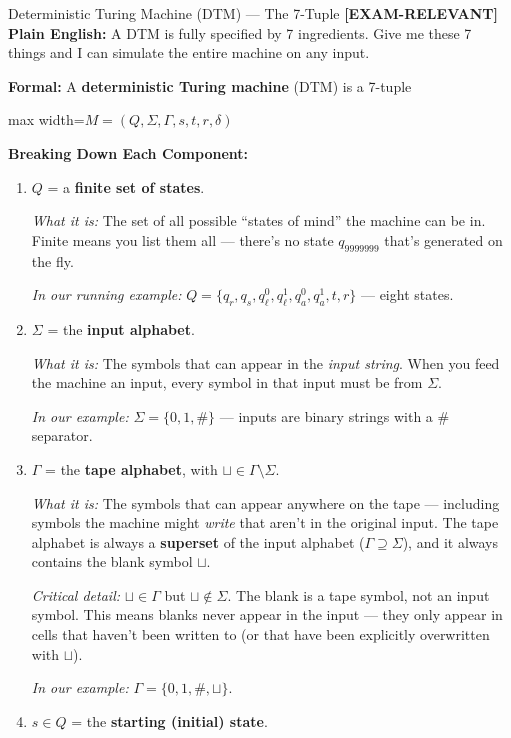 \documentclass[11pt,a4paper]{article}
\newcommand{\fitmath}[1]{\begin{adjustbox}{max width=\linewidth}$\displaystyle #1$\end{adjustbox}}
\newcommand{\kemark}{\textcolor{red!70!black}{\textbf{[EXAM-RELEVANT]}}}
\begin{document}
\begin{definitionbox}{Deterministic Turing Machine (DTM) --- The 7-Tuple \kemark}
\textbf{Plain English:} A DTM is fully specified by 7 ingredients. Give me these 7 things and I can simulate the entire machine on any input.

\textbf{Formal:} A \textbf{deterministic Turing machine} (DTM) is a 7-tuple
\fitmath{M = (Q, \Sigma, \Gamma, s, t, r, \delta)}

\textbf{Breaking Down Each Component:}

\begin{enumerate}
\item $Q$ = a \textbf{finite set of states}.

\textit{What it is:} The set of all possible ``states of mind'' the machine can be in. Finite means you list them all --- there's no state $q_{9999999}$ that's generated on the fly.

\textit{In our running example:} $Q = \{q_r, q_s, q_\ell^0, q_\ell^1, q_a^0, q_a^1, t, r\}$ --- eight states.

\item $\Sigma$ = the \textbf{input alphabet}.

\textit{What it is:} The symbols that can appear in the \textit{input string}. When you feed the machine an input, every symbol in that input must be from $\Sigma$.

\textit{In our example:} $\Sigma = \{0, 1, \#\}$ --- inputs are binary strings with a \# separator.

\item $\Gamma$ = the \textbf{tape alphabet}, with $\sqcup \in \Gamma \setminus \Sigma$.

\textit{What it is:} The symbols that can appear anywhere on the tape --- including symbols the machine might \textit{write} that aren't in the original input. The tape alphabet is always a \textbf{superset} of the input alphabet ($\Gamma \supseteq \Sigma$), and it always contains the blank symbol $\sqcup$.

\textit{Critical detail:} $\sqcup \in \Gamma$ but $\sqcup \notin \Sigma$. The blank is a tape symbol, not an input symbol. This means blanks never appear in the input --- they only appear in cells that haven't been written to (or that have been explicitly overwritten with $\sqcup$).

\textit{In our example:} $\Gamma = \{0, 1, \#, \sqcup\}$.

\item $s \in Q$ = the \textbf{starting (initial) state}.


\end{enumerate}
\end{definitionbox}
\end{document}
